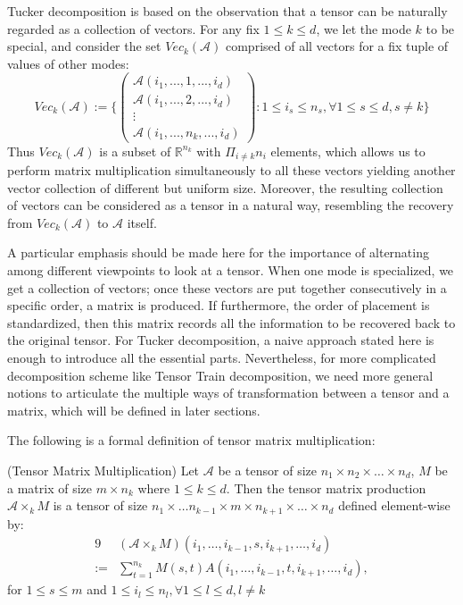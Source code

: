 \documentclass[12pt]{article}
\begin{document}
Tucker decomposition is based on the observation that a tensor can be naturally regarded as a collection of vectors. For any fix $1 \leq k \leq d$, we let the mode $k$ to be special, and consider the set $Vec_k(\mathcal{A})$ comprised of all vectors for a fix tuple of values of other modes:
$$
Vec_k(\mathcal{A}) := \{ 
\begin{pmatrix}
\mathcal{A}(i_1, ..., 1, ..., i_d) \\
\mathcal{A}(i_1, ..., 2, ..., i_d) \\
\vdots   \\
\mathcal{A}(i_1, ..., n_k, ..., i_d)
\end{pmatrix}
: 1 \leq i_s \leq n_s, \forall 1 \leq s \leq d, s \neq k\}
$$
Thus $Vec_k(\mathcal{A})$ is a subset of $\mathbb{R}^{n_k}$ with $\Pi_{i \neq k}n_i$ elements, which allows us to perform matrix multiplication simultaneously to all these vectors yielding another vector collection of different but uniform size. Moreover, the resulting collection of vectors can be considered as a tensor in a natural way, resembling the recovery from $Vec_k(\mathcal{A})$ to $\mathcal{A}$ itself.

A particular emphasis should be made here for the importance of alternating among different viewpoints to look at a tensor. When one mode is specialized, we get a collection of vectors; once these vectors are put together consecutively in a specific order, a matrix is produced. If furthermore, the order of placement is standardized, then this matrix records all the information to be recovered back to the original tensor. For Tucker decomposition, a naive approach stated here is enough to introduce all the essential parts. Nevertheless, for more complicated decomposition scheme like Tensor Train decomposition, we need more general notions to articulate the multiple ways of transformation between a tensor and a matrix, which will be defined in later sections.

The following is a formal definition of tensor matrix multiplication:

\begin{mydef}{(Tensor Matrix Multiplication)}
Let $\mathcal{A}$ be a tensor of size $n_1 \times n_2 \times \dots \times n_d$, $M$ be a matrix of size $m \times n_k$ where $1 \leq k \leq d$. Then the tensor matrix production $\mathcal{A} \times_k M$ is a tensor of size $n_1 \times \dots n_{k-1} \times m \times n_{k+1} \times \dots \times n_d$ defined element-wise by:
\begin{alignat*}{9}
& (\mathcal{A} \times_k M)(i_1, \dots, i_{k-1}, s, i_{k+1}, \dots, i_d) \\
:= &\sum_{t = 1}^{n_k} M(s, t) A(i_1, \dots, i_{k-1}, t, i_{k+1}, \dots, i_d),
\end{alignat*}
for $1 \leq s \leq m$ and $1 \leq i_l \leq n_l, \forall 1 \leq l \leq d, l \neq k$
\end{mydef}
\end{document}
